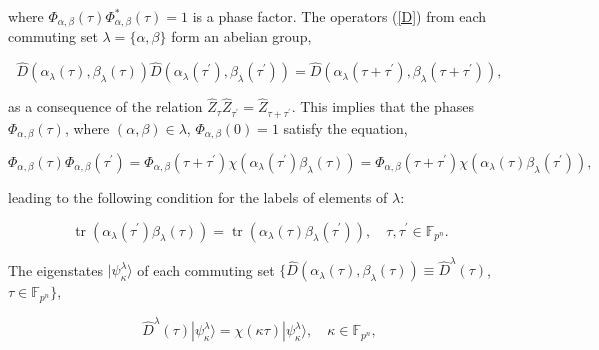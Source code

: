 \documentclass[quantumrep,article,submit,pdftex,moreauthors]{Definitions/mdpi}
\DeclareMathOperator{\tr}{tr}
\begin{document}
where $\Phi_{\alpha ,\beta }\left( \tau \right) \Phi_{\alpha ,\beta }^{\ast
}\left( \tau \right) = 1$ is a phase factor. The operators (\ref{D}) from each
commuting set $\lambda =\{\alpha ,\beta\}$ form an abelian group,

\begin{equation}
  \hat{D}\left( \alpha_{\lambda}(\tau),\beta_{\lambda }(\tau) \right)
  \hat{D}\left(
    \alpha_{\lambda}(\tau^{\prime }),\beta_{\lambda }(\tau^{\prime })
  \right)
  = \hat{D}\left(
    \alpha_{\lambda}(\tau + \tau^{\prime}),
    \beta_{\lambda}(\tau + \tau^{\prime})
  \right),
  \label{DD}
\end{equation}

as a consequence of the relation $\hat{Z}_{\tau }\hat{Z}_{\tau ^{\prime}} =
\hat{Z}_{\tau +\tau^{\prime}}$. This implies that the phases $\Phi_{\alpha,\beta
}\left( \tau \right) $, where $(\alpha ,\beta )\in \lambda$, $\Phi_{\alpha
,\beta }\left( 0\right) = 1$ satisfy the equation,

\begin{equation}
  \Phi_{\alpha,\beta}\left( \tau \right)
  \Phi_{\alpha,\beta }\left(\tau^{\prime}\right)
  = \Phi_{\alpha,\beta }\left( \tau +\tau^{\prime}\right)
  \chi\left(\alpha_{\lambda}(\tau^{\prime})\beta_{\lambda}(\tau)\right)
  = \Phi_{\alpha,\beta}\left(\tau + \tau^{\prime}\right)
  \chi\left(\alpha_{\lambda}(\tau)\beta_{\lambda}(\tau^{\prime })\right),
  \label{Phi}
\end{equation}

leading to the following condition for the labels of elements of $\lambda$:

\begin{equation}
  \tr\left(\alpha_{\lambda}(\tau^{\prime })\beta_{\lambda }(\tau)\right)
  = \tr\left(\alpha_{\lambda}(\tau)\beta_{\lambda }(\tau^{\prime })\right),
  \quad \tau,\tau^{\prime} \in \mathbb{F}_{p^{n}}.
  \label{CC}
\end{equation}

The eigenstates $|\psi_\kappa^\lambda\rangle$ of each commuting set
$\{\hat{D}\left(\alpha_{\lambda}(\tau),\beta_{\lambda}(\tau)\right) \equiv
\hat{D}^{\lambda}(\tau)$, $\tau \in \mathbb{F}_{p^{n}}\}$,

\begin{equation}
  \hat{D}^{\lambda}(\tau) |\psi_{\kappa}^{\lambda}\rangle
  = \chi(\kappa \tau) |\psi_{\kappa}^{\lambda }\rangle,
  \quad \kappa \in \mathbb{F}_{p^{n}},
  \label{states}
\end{equation}
\end{document}
